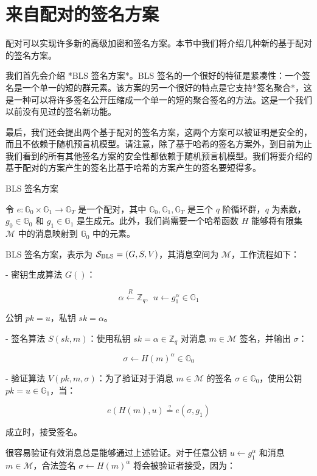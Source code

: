 \section{来自配对的签名方案}\label{sec:15-5}

配对可以实现许多新的高级加密和签名方案。本节中我们将介绍几种新的基于配对的签名方案。

我们首先会介绍 *BLS 签名方案*。BLS 签名的一个很好的特征是紧凑性：一个签名是一个单一的短的群元素。该方案的另一个很好的特点是它支持*签名聚合*，这是一种可以将许多签名公开压缩成一个单一的短的聚合签名的方法。这是一个我们以前没有见过的签名新功能。

最后，我们还会提出两个基于配对的签名方案，这两个方案可以被证明是安全的，而且不依赖于随机预言机模型。请注意，除了基于哈希的签名方案外，到目前为止我们看到的所有其他签名方案的安全性都依赖于随机预言机模型。我们将要介绍的基于配对的方案产生的签名比基于哈希的方案产生的签名要短得多。

BLS 签名方案

令 $e:\mathbb{G}_0 \times \mathbb{G}_1 \to \mathbb{G}_T$ 是一个配对，其中 $\mathbb{G}_0,\mathbb{G}_1,\mathbb{G}_T$ 是三个 $q$ 阶循环群，$q$ 为素数，$g_0 \in \mathbb{G}_0$ 和 $g_1 \in \mathbb{G}_1$ 是生成元。此外，我们尚需要一个哈希函数 $H$ 能够将有限集 $\mathcal{M}$ 中的消息映射到 $\mathbb{G}_0$ 中的元素。

BLS 签名方案，表示为 $\mathcal{S}_{\rm BLS}=(G,S,V)$，其消息空间为 $\mathcal{M}$，工作流程如下：

- 密钥生成算法 $G()$：
    
    $$
    \alpha\stackrel{R}\leftarrow\mathbb{Z}_q,~~
    u\leftarrow g_1^\alpha \in \mathbb{G}_1
    $$
    
    公钥 $pk = u$，私钥 $sk=\alpha$。
    
- 签名算法 $S(sk,m)$：使用私钥 $sk=\alpha \in \mathbb{Z}_q$ 对消息 $m\in\mathcal{M}$ 签名，并输出 $\sigma$：
    
    $$
    \sigma \leftarrow H(m)^\alpha \in \mathbb{G}_0
    $$
    
- 验证算法 $V(pk,m,\sigma)$：为了验证对于消息 $m\in\mathcal{M}$ 的签名 $\sigma \in \mathbb{G}_0$，使用公钥 $pk = u \in \mathbb{G}_1$，当：
    
    $$
    e(H(m),u)\overset{?}=e(\sigma,g_1)
    $$
    
    成立时，接受签名。
    

很容易验证有效消息总是能够通过上述验证。对于任意公钥 $u\leftarrow g_1^\alpha$ 和消息 $m\in\mathcal{M}$，合法签名 $\sigma \leftarrow H(m)^\alpha$  将会被验证者接受，因为：


